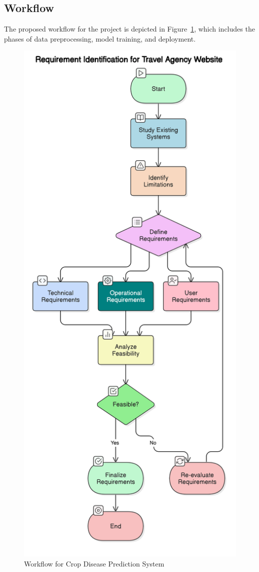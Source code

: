 \subsection{Workflow}
The proposed workflow for the project is depicted in Figure~\ref{fig:methodology_workflow}, which includes the phases of data preprocessing, model training, and deployment.

\begin{figure}[h]
    \centering
    \includegraphics[width=0.5\linewidth]{Images/flow.png}
    \caption{Workflow for Crop Disease Prediction System}
    \label{fig:methodology_workflow}
\end{figure}

